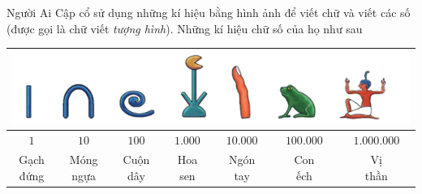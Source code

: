 	\vskip 0.1cm
	Người Ai Cập cổ sử dụng những kí hiệu bằng hình ảnh để viết chữ và viết các số (được gọi là chữ viết \textit{tượng hình}). Những kí hiệu chữ số của họ như sau 
	\begin{table}[H]
		\vspace*{-5pt}
		\setlength{\tabcolsep}{4.1pt}
		\centering
		\begin{tabular}{|c|c|c|c|c|c|c|}
			\hline
			\multicolumn{7}{|c|}{\includegraphics[width=0.95\linewidth]{2}}\\
			\hline
			$1$&$10$ &$100$&$1{.}000$&$10{.}000$&$100{.}000$&$1{.}000{.}000$\\
			\hline
			\shortstack{Gạch \\đứng}&\shortstack{Móng\\ ngựa}&\shortstack{Cuộn\\ dây}&\shortstack{Hoa \\sen}&\shortstack{Ngón\\ tay}&\shortstack{Con\\ ếch}&\shortstack{Vị \\thần}\\
			\hline
		\end{tabular}
	\vspace*{-5pt}
	\end{table}
